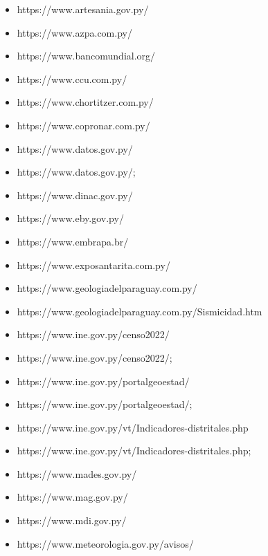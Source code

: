 \begin{itemize}
  https:/\allowbreak /www.armada.mil.py/\allowbreak 
\item
  https:/\allowbreak /www.artesania.gov.py/\allowbreak 
\item
  https:/\allowbreak /www.azpa.com.py/\allowbreak 
\item
  https:/\allowbreak /www.bancomundial.org/\allowbreak 
\item
  https:/\allowbreak /www.ccu.com.py/\allowbreak 
\item
  https:/\allowbreak /www.chortitzer.com.py/\allowbreak 
\item
  https:/\allowbreak /www.copronar.com.py/\allowbreak 
\item
  https:/\allowbreak /www.datos.gov.py/\allowbreak 
\item
  https:/\allowbreak /www.datos.gov.py/\allowbreak ;
\item
  https:/\allowbreak /www.dinac.gov.py/\allowbreak 
\item
  https:/\allowbreak /www.eby.gov.py/\allowbreak 
\item
  https:/\allowbreak /www.embrapa.br/\allowbreak 
\item
  https:/\allowbreak /www.exposantarita.com.py/\allowbreak 
\item
  https:/\allowbreak /www.geologiadelparaguay.com.py/\allowbreak 
\item
  https:/\allowbreak /www.geologiadelparaguay.com.py/\allowbreak Sismicidad.htm
\item
  https:/\allowbreak /www.ine.gov.py/\allowbreak censo2022/\allowbreak 
\item
  https:/\allowbreak /www.ine.gov.py/\allowbreak censo2022/\allowbreak ;
\item
  https:/\allowbreak /www.ine.gov.py/\allowbreak portalgeoestad/\allowbreak 
\item
  https:/\allowbreak /www.ine.gov.py/\allowbreak portalgeoestad/\allowbreak ;
\item
  https:/\allowbreak /www.ine.gov.py/\allowbreak vt/\allowbreak Indicadores-distritales.php
\item
  https:/\allowbreak /www.ine.gov.py/\allowbreak vt/\allowbreak Indicadores-distritales.php;
\item
  https:/\allowbreak /www.mades.gov.py/\allowbreak 
\item
  https:/\allowbreak /www.mag.gov.py/\allowbreak 
\item
  https:/\allowbreak /www.mdi.gov.py/\allowbreak 
\item
  https:/\allowbreak /www.meteorologia.gov.py/\allowbreak avisos/\allowbreak 

\end{itemize}

